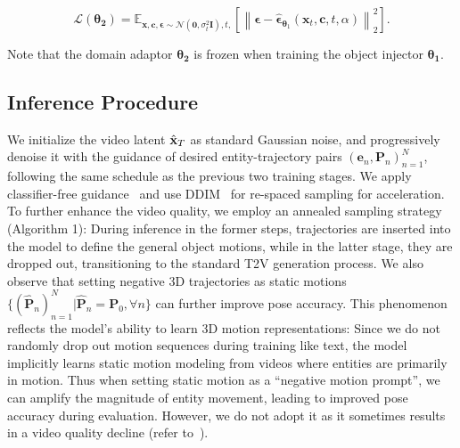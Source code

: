 \begin{equation}
\mathcal{L}(\boldsymbol{\theta_2})=\mathbb{E}_{\mathbf{x}, \mathbf{c}, \boldsymbol{\epsilon} \sim \mathcal{N}\left(\mathbf{0}, \sigma_{t}^2 \mathbf{I}\right), t, }\left[\left\|\boldsymbol{\epsilon}-\hat{\boldsymbol{\epsilon}}_{\boldsymbol{\theta}_1}\left(\mathbf{x}_t, \mathbf{c}, t, \alpha \right)\right\|_2^2\right].
\end{equation}

Note that the domain adaptor $\boldsymbol{\theta_2}$ is frozen when training the object injector $\boldsymbol{\theta_1}$. 

\subsection{Inference Procedure} \label{sec:inference}
We initialize the video latent $\hat{\mathbf{x}}_T$ as standard Gaussian noise, and progressively denoise it with the guidance of desired entity-trajectory pairs $(\mathbf{e}_n,\mathbf{P}_n)_{n=1}^N$, following the same schedule as the previous two training stages. We apply classifier-free guidance~\citep{ho2022classifier} and use DDIM~\citep{song2020denoising} for re-spaced sampling for acceleration. To further enhance the video quality, we employ an annealed sampling strategy (Algorithm 1): During inference in the former steps, trajectories are inserted into the model to define the general object motions, while in the latter stage, they are dropped out, transitioning to the standard T2V generation process. We also observe that setting negative 3D trajectories as static motions $\{(\hat{\mathbf{P}}_n)_{n=1}^N|\hat{\mathbf{P}}_n=\mathbf{P}_0,\forall n\}$ can further improve pose accuracy. This phenomenon reflects the model's ability to learn 3D motion representations: Since we do not randomly drop out motion sequences during training like text, the model implicitly learns static motion modeling from videos where entities are primarily in motion. Thus when setting static motion as a ``negative motion prompt”, we can amplify the magnitude of entity movement, leading to improved pose accuracy during evaluation. However, we do not adopt it as it sometimes results in a video quality decline (refer to~).


